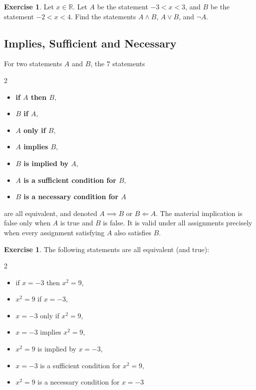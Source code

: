 \documentclass[11pt]{article}
\theoremstyle{definition}
\newtheorem{example}[theorem]{Exercise}
\theoremstyle{remark}
\newcommand{\RR}{\mathbb{R}}
\begin{document}
\begin{example}\label{tmua-6-unit-004}
    Let \(x \in \RR\). Let \(A\) be the statement \(-3 < x < 3\), and \(B\) be the statement \(-2 < x < 4\). Find the statements \(A \land B\), \(A \lor B\), and \(\lnot A\).
\end{example}

\subsection{Implies, Sufficient and Necessary}\label{tmua-6-subsection-003}

For two statements \(A\) and \(B\), the \(7\) statements
\begin{multicols}{2}
    \begin{itemize}
        \item \textbf{if \(A\) then \(B\)},
        \item \textbf{\(B\) if \(A\)},
        \item \textbf{\(A\) only if \(B\)},
        \item \textbf{\(A\) implies \(B\)},
        \item \textbf{\(B\) is implied by \(A\)},
        \item \textbf{\(A\) is a sufficient condition for \(B\)},
        \item \textbf{\(B\) is a necessary condition for \(A\)}
    \end{itemize}
\end{multicols}
are all equivalent, and denoted \(A \implies B\) or \(B \Longleftarrow A\). The material implication is false only when \(A\) is true and \(B\) is false. It is valid under all assignments precisely when every assignment satisfying \(A\) also satisfies \(B\).

\begin{example}\label{tmua-6-unit-005}
    The following statements are all equivalent (and true):
    \begin{multicols}{2}
        \begin{itemize}
            \item if \(x = -3\) then \(x^2 = 9\),
            \item \(x^2 = 9\) if \(x = -3\),
            \item \(x = -3\) only if \(x^2 = 9\),
            \item \(x = -3\) implies \(x^2 = 9\),
            \item \(x^2 = 9\) is implied by \(x = -3\),
            \item \(x = -3\) is a sufficient condition for \(x^2 = 9\),
            \item \(x^2 = 9\) is a necessary condition for \(x = -3\)
        \end{itemize}
    \end{multicols}
\end{example}
\end{document}

